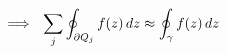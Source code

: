 \documentclass[preview]{standalone}
\begin{document}
\begin{align*}
\special{dvisvgm:raw <g id='unique000'>}\Longrightarrow\ \ \sum_j \oint_{\partial Q_j} f(z)\, dz \approx \oint_{\gamma} f(z)\, dz\special{dvisvgm:raw </g>}
\end{align*}
\end{document}
